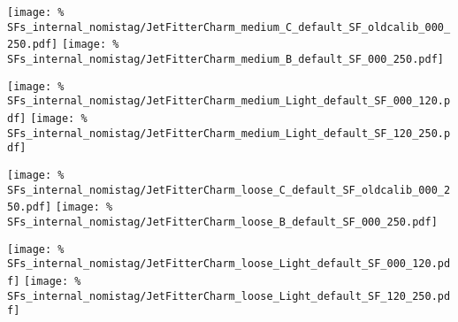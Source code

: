 \begin{cfig}
  \texttt{[image: \%
SFs\_internal\_nomistag/JetFitterCharm\_medium\_C\_default\_SF\_oldcalib\_000\_250.pdf]}
  \texttt{[image: \%
SFs\_internal\_nomistag/JetFitterCharm\_medium\_B\_default\_SF\_000\_250.pdf]}
  \caption[JetFitterCharm medium $b$ and $c$ scale factors]{Dependence of the $c$-jet (left) and $b$-jet (right) efficiency scale factors on the jet $\pt$ for the JetFitterCharm medium operating point. \bcSF.}
  \label{JFC_SF_B}
\end{cfig}

\begin{cfig}
  \texttt{[image: \%
SFs\_internal\_nomistag/JetFitterCharm\_medium\_Light\_default\_SF\_000\_120.pdf]}
  \texttt{[image: \%
SFs\_internal\_nomistag/JetFitterCharm\_medium\_Light\_default\_SF\_120\_250.pdf]}
  \caption[JetFitterCharm light scale factors]{Dependence of the light-jet efficiency scale factor on the jet $\pt$, for $0.0 < | \eta | < 1.2$ (left) or
    $1.2 < | \eta | < 2.5$ (right), for the JetFitterCharm medium operating point, \lSF.}
  \label{JFC_SF_L1}
\end{cfig}

\begin{cfig}
  \texttt{[image: \%
SFs\_internal\_nomistag/JetFitterCharm\_loose\_C\_default\_SF\_oldcalib\_000\_250.pdf]}
  \texttt{[image: \%
SFs\_internal\_nomistag/JetFitterCharm\_loose\_B\_default\_SF\_000\_250.pdf]}
  \caption[JetFitterCharm loose $b$ and $c$ scale factors]{Dependence of the $c$-jet (left) and $b$-jet (right) efficiency scale factors on the jet $\pt$ for the JetFitterCharm loose operating point. \bcSF.}
  \label{JFC_SF_B_loose}
\end{cfig}

\begin{cfig}
  \texttt{[image: \%
SFs\_internal\_nomistag/JetFitterCharm\_loose\_Light\_default\_SF\_000\_120.pdf]}
  \texttt{[image: \%
SFs\_internal\_nomistag/JetFitterCharm\_loose\_Light\_default\_SF\_120\_250.pdf]}
  \caption[JetFitterCharm loose light scale factors]{Dependence of the light-jet efficiency scale factor on the jet $\pt$, for $0.0 < | \eta | < 1.2$ (left) or 
    $1.2 < | \eta | < 2.5$ (right), for the JetFitterCharm loose operating point, \lSF. The total uncertainty is constrained to give a maximum corrected efficiency of 1.}
  \label{JFC_SF_L1_loose}
\end{cfig}

\clearpage

